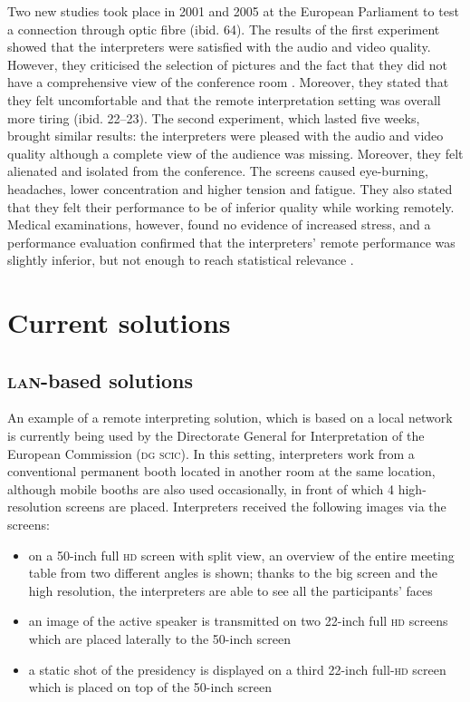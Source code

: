 \documentclass[output=paper]{langsci/langscibook}
\begin{document}
Two new studies took place in 2001 and 2005 at the European Parliament to test a connection through optic fibre (ibid. 64). The results of the first experiment showed that the interpreters were satisfied with the audio and video quality. However, they criticised the selection of pictures and the fact that they did not have a comprehensive view of the conference room \citep[19--21]{Europarl2001}. Moreover, they stated that they felt uncomfortable and that the remote interpretation setting was overall more tiring (ibid. 22--23). The second experiment, which lasted five weeks, brought similar results: the interpreters were pleased with the audio and video quality although a complete view of the audience was missing. Moreover, they felt alienated and isolated from the conference. The screens caused eye-burning, headaches, lower concentration and higher tension and fatigue. They also stated that they felt their performance to be of inferior quality while working remotely. Medical examinations, however, found no evidence of increased stress, and a performance evaluation confirmed that the interpreters’ remote performance was slightly inferior, but not enough to reach statistical relevance \citep[225--243]{Roziner2010}.

\section{Current solutions}
\label{sec:ziegler:04}
\subsection{\textsc{lan}-based solutions} 
\label{sub:ziegler:4.1}
An example of a remote interpreting solution, which is based on a local network is currently being used by the Directorate General for Interpretation of the European Commission (\textsc{dg scic}). In this setting, interpreters work from a conventional permanent booth located in another room at the same location, although mobile booths are also used occasionally, in front of which 4 high-resolution screens are placed. Interpreters received the following images via the screens:

\begin{itemize}
\item on a 50-inch full \textsc{hd} screen with split view, an overview of the entire meeting table from two different angles is shown; thanks to the big screen and the high resolution, the interpreters are able to see all the participants’ faces
\item an image of the active speaker is transmitted on two 22-inch full \textsc{hd} screens which are placed laterally to the 50-inch screen
\item a static shot of the presidency is displayed on a third 22-inch full-\textsc{hd} screen which is placed on top of the 50-inch screen
\end{itemize}
\end{document}
